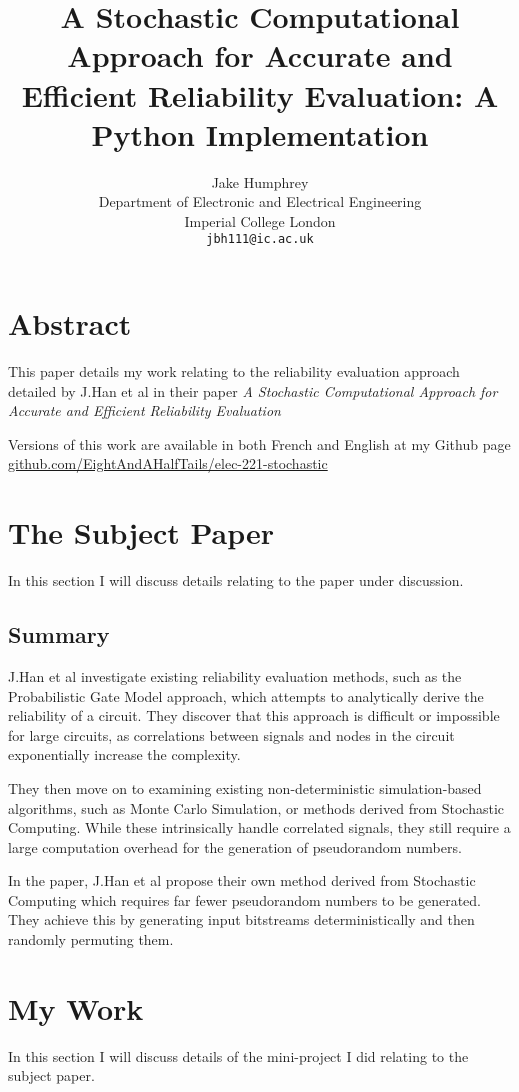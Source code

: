 \documentclass{article}
\title{A Stochastic Computational Approach for Accurate and Efficient Reliability Evaluation: A Python Implementation}
\author{Jake Humphrey\\
	Department of Electronic and Electrical Engineering\\
  Imperial College London\\
  \texttt{jbh111@ic.ac.uk} }
\begin{document}
\maketitle

\section{Abstract}\label{sec:abstract}

This paper details my work relating to the reliability evaluation approach detailed by J.Han et al in their paper \emph{A Stochastic Computational Approach for Accurate and Efficient Reliability Evaluation}\cite{han12}

Versions of this work are available in both French and English at my Github page \url{github.com/EightAndAHalfTails/elec-221-stochastic}

\section{The Subject Paper}
In this section I will discuss details relating to the paper under discussion.

\subsection{Summary}
J.Han et al investigate existing reliability evaluation methods, such as the Probabilistic Gate Model approach, which attempts to analytically derive the reliability of a circuit. They discover that this approach is difficult or impossible for large circuits, as correlations between signals and nodes in the circuit exponentially increase the complexity.

They then move on to examining existing non-deterministic simulation-based algorithms, such as Monte Carlo Simulation, or methods derived from Stochastic Computing. While these intrinsically handle correlated signals, they still require a large computation overhead for the generation of pseudorandom numbers.

In the paper, J.Han et al propose their own method derived from Stochastic Computing which requires far fewer pseudorandom numbers to be generated. They achieve this by generating input bitstreams deterministically and then randomly permuting them.

\section{My Work}
In this section I will discuss details of the mini-project I did relating to the subject paper.
\end{document}
